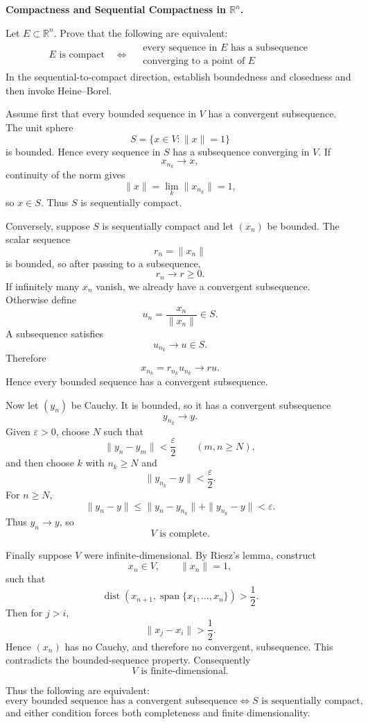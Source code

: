 \begin{problem}[CP-II-0185]
\label{prob:cp-ii-0185}
\textbf{Compactness and Sequential Compactness in \(\mathbb R^n\).}

\hspace*{1.5em}Let \(E\subset\mathbb R^n\). Prove that the following are equivalent:
\[
\begin{gathered}
E\text{ is compact}
\quad\Longleftrightarrow\quad
\begin{gathered}
\text{every sequence in }E\text{ has a subsequence}\\
\text{converging to a point of }E
\end{gathered}
\end{gathered}
\]
In the sequential-to-compact direction, establish boundedness and closedness and
then invoke Heine--Borel.
\end{problem}

\begin{solution}
Assume first that every bounded sequence in \(V\) has a convergent subsequence. The unit sphere
\[
S=\{x\in V:\|x\|=1\}
\]
is bounded. Hence every sequence in \(S\) has a subsequence converging in \(V\). If
\[
x_{n_k}\to x,
\]
continuity of the norm gives
\[
\|x\|
=
\lim_k\|x_{n_k}\|
=
1,
\]
so \(x\in S\). Thus \(S\) is sequentially compact.

Conversely, suppose \(S\) is sequentially compact and let \((x_n)\) be bounded. The scalar sequence
\[
r_n=\|x_n\|
\]
is bounded, so after passing to a subsequence,
\[
r_n\to r\ge0.
\]
If infinitely many \(x_n\) vanish, we already have a convergent subsequence. Otherwise define
\[
u_n=\frac{x_n}{\|x_n\|}\in S.
\]
A subsequence satisfies
\[
u_{n_k}\to u\in S.
\]
Therefore
\[
x_{n_k}
=
r_{n_k}u_{n_k}
\longrightarrow
ru.
\]
Hence every bounded sequence has a convergent subsequence.

Now let \((y_n)\) be Cauchy. It is bounded, so it has a convergent subsequence
\[
y_{n_k}\to y.
\]
Given \(\varepsilon>0\), choose \(N\) such that
\[
\|y_n-y_m\|<\frac{\varepsilon}{2}
\qquad(m,n\ge N),
\]
and then choose \(k\) with \(n_k\ge N\) and
\[
\|y_{n_k}-y\|<\frac{\varepsilon}{2}.
\]
For \(n\ge N\),
\[
\|y_n-y\|
\le
\|y_n-y_{n_k}\|+\|y_{n_k}-y\|
<
\varepsilon.
\]
Thus \(y_n\to y\), so
\[
\boxed{V\text{ is complete}.}
\]

Finally suppose \(V\) were infinite-dimensional. By Riesz's lemma, construct
\[
x_n\in V,
\qquad
\|x_n\|=1,
\]
such that
\[
\operatorname{dist}
\left(
x_{n+1},
\operatorname{span}\{x_1,\ldots,x_n\}
\right)
>
\frac12.
\]
Then for \(j>i\),
\[
\|x_j-x_i\|>\frac12.
\]
Hence \((x_n)\) has no Cauchy, and therefore no convergent, subsequence. This contradicts the bounded-sequence property. Consequently
\[
\boxed{V\text{ is finite-dimensional}.}
\]

Thus the following are equivalent:
\[
\boxed{
\text{every bounded sequence has a convergent subsequence}
\iff
S\text{ is sequentially compact},
}
\]
and either condition forces both completeness and finite dimensionality.
\end{solution}


